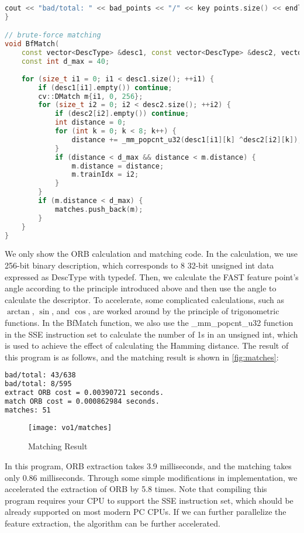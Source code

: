 \begin{lstlisting}[language=c++,caption=slambook2/ch7/orb_self.cpp (part)]
    cout << "bad/total: " << bad_points << "/" << key points.size() << endl;
}

// brute-force matching
void BfMatch(
    const vector<DescType> &desc1, const vector<DescType> &desc2, vector<cv::DMatch> &matches) {
    const int d_max = 40;
    
    for (size_t i1 = 0; i1 < desc1.size(); ++i1) {
        if (desc1[i1].empty()) continue;
        cv::DMatch m{i1, 0, 256};
        for (size_t i2 = 0; i2 < desc2.size(); ++i2) {
            if (desc2[i2].empty()) continue;
            int distance = 0;
            for (int k = 0; k < 8; k++) {
                distance += _mm_popcnt_u32(desc1[i1][k] ^desc2[i2][k]);
            }
            if (distance < d_max && distance < m.distance) {
                m.distance = distance;
                m.trainIdx = i2;
            }
        }
        if (m.distance < d_max) {
            matches.push_back(m);
        }
    }
}
\end{lstlisting}
We only show the ORB calculation and matching code. In the calculation, we use 256-bit binary description, which corresponds to 8 32-bit unsigned int data expressed as DescType with typedef. Then, we calculate the FAST feature point's angle according to the principle introduced above and then use the angle to calculate the descriptor. To accelerate, some complicated calculations, such as $\arctan$, $\sin$, and $\cos$, are worked around by the principle of trigonometric functions. In the BfMatch function, we also use the \_mm\_popcnt\_u32 function in the SSE instruction set to calculate the number of 1s in an unsigned int, which is used to achieve the effect of calculating the Hamming distance. The result of this program is as follows, and the matching result is shown in \autoref{fig:matches}:

\begin{lstlisting}[language=sh,caption=Terminal output:]
bad/total: 43/638
bad/total: 8/595
extract ORB cost = 0.00390721 seconds.
match ORB cost = 0.000862984 seconds.
matches: 51
\end{lstlisting}

\begin{figure}[!htp]
    \centering
    \texttt{[image: vo1/matches]}
    \caption{Matching Result}
    \label{fig:matches}
\end{figure}

In this program, ORB extraction takes 3.9 milliseconds, and the matching takes only 0.86 milliseconds. Through some simple modifications in implementation, we accelerated the extraction of ORB by 5.8 times. Note that compiling this program requires your CPU to support the SSE instruction set, which should be already supported on most modern PC CPUs. If we can further parallelize the feature extraction, the algorithm can be further accelerated.

